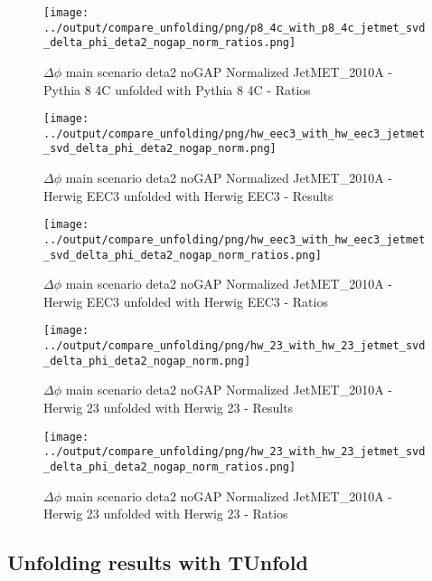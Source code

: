 \documentclass[11pt]{book}
\begin{document}
\begin{figure}[ht]
\centering
\texttt{[image: ../output/compare\_unfolding/png/p8\_4c\_with\_p8\_4c\_jetmet\_svd\_delta\_phi\_deta2\_nogap\_norm\_ratios.png]}
\caption{$\Delta\phi$ main scenario deta2 noGAP Normalized JetMET\_2010A - Pythia 8 4C unfolded with Pythia 8 4C - Ratios}
\label{p8_p8_jetmet_svd_delta_phi_deta2_nogap_norm_b}
\end{figure}

\begin{figure}[ht]
\centering
\texttt{[image: ../output/compare\_unfolding/png/hw\_eec3\_with\_hw\_eec3\_jetmet\_svd\_delta\_phi\_deta2\_nogap\_norm.png]}
\caption{$\Delta\phi$ main scenario deta2 noGAP Normalized JetMET\_2010A - Herwig EEC3 unfolded with Herwig EEC3 - Results}
\label{hw_eec3_hw_eec3_jetmet_svd_delta_phi_deta2_nogap_norm_a}
\end{figure}

\begin{figure}[ht]
\centering
\texttt{[image: ../output/compare\_unfolding/png/hw\_eec3\_with\_hw\_eec3\_jetmet\_svd\_delta\_phi\_deta2\_nogap\_norm\_ratios.png]}
\caption{$\Delta\phi$ main scenario deta2 noGAP Normalized JetMET\_2010A - Herwig EEC3 unfolded with Herwig EEC3 - Ratios}
\label{hw_eec3_hw_eec3_jetmet_svd_delta_phi_deta2_nogap_norm_b}
\end{figure}

\begin{figure}[ht]
\centering
\texttt{[image: ../output/compare\_unfolding/png/hw\_23\_with\_hw\_23\_jetmet\_svd\_delta\_phi\_deta2\_nogap\_norm.png]}
\caption{$\Delta\phi$ main scenario deta2 noGAP Normalized JetMET\_2010A - Herwig 23 unfolded with Herwig 23 - Results}
\label{hw_23_hw_23_jetmet_svd_delta_phi_deta2_nogap_norm_a}
\end{figure}

\begin{figure}[ht]
\centering
\texttt{[image: ../output/compare\_unfolding/png/hw\_23\_with\_hw\_23\_jetmet\_svd\_delta\_phi\_deta2\_nogap\_norm\_ratios.png]}
\caption{$\Delta\phi$ main scenario deta2 noGAP Normalized JetMET\_2010A - Herwig 23 unfolded with Herwig 23 - Ratios}
\label{hw_23_hw_23_jetmet_svd_delta_phi_deta2_nogap_norm_b}
\end{figure}



\clearpage
\subsection{Unfolding results with TUnfold}
\end{document}
